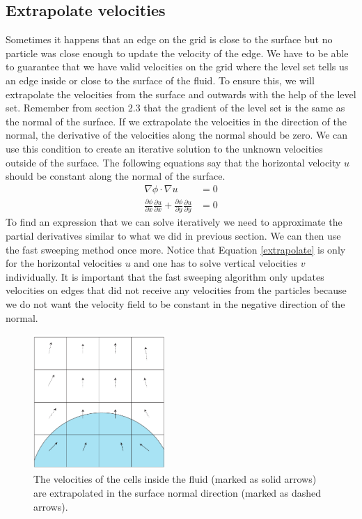 \subsection{Extrapolate velocities}

Sometimes it happens that an edge on the grid is close to the surface but no particle was close enough to update the velocity of the edge. We have to be able to guarantee that we have valid velocities on the grid where the level set tells us an edge inside or close to the surface of the fluid. To ensure this, we will extrapolate the velocities from the surface and outwards with the help of the level set. Remember from section 2.3 that the gradient of the level set is the same as the normal of the surface. If we extrapolate the velocities in the direction of the normal, the derivative of the velocities along the normal should be zero. We can use this condition to create an iterative solution to the unknown velocities outside of the surface. The following equations say that the horizontal velocity $u$ should be constant along the normal of the surface.
\begin{equation}
\begin{split}
\nabla \phi \cdot \nabla u &= 0 \\
\frac{\partial \phi}{\partial x}\frac{\partial u}{\partial x} + 
\frac{\partial \phi}{\partial y}\frac{\partial u}{\partial y}&= 0
\end{split}
\label{extrapolate}
\end{equation}
\noindent
To find an expression that we can solve iteratively we need to approximate the partial derivatives similar to what we did in previous section. We can then use the fast sweeping method once more. Notice that Equation \ref{extrapolate} is only for the horizontal velocities $u$ and one has to solve vertical velocities $v$ individually. It is important that the fast sweeping algorithm only updates velocities on edges that did not receive any velocities from the particles because we do not want the velocity field to be constant in the negative direction of the normal.
\begin{figure}[ht!]
\centering
\includegraphics[width=50mm]{img/extrapolate.pdf}
\caption{The velocities of the cells inside the fluid (marked as solid arrows) are extrapolated in the surface normal direction (marked as dashed arrows).}
\label{extrapic}
\end{figure}
